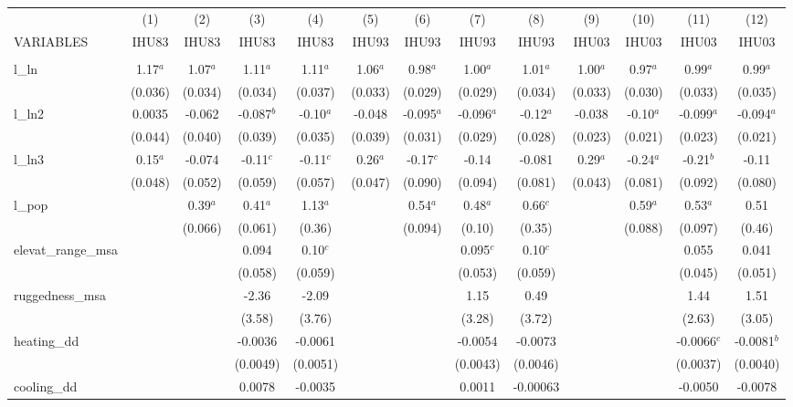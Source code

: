 \documentclass[]{article}
\begin{document}
\begin{tabular}{lcccccccccccc} \hline
 & (1) & (2) & (3) & (4) & (5) & (6) & (7) & (8) & (9) & (10) & (11) & (12) \\
VARIABLES & IHU83 & IHU83 & IHU83 & IHU83 & IHU93 & IHU93 & IHU93 & IHU93 & IHU03 & IHU03 & IHU03 & IHU03 \\ \hline
 &  &  &  &  &  &  &  &  &  &  &  &  \\
l\_ln & 1.17$^a$ & 1.07$^a$ & 1.11$^a$ & 1.11$^a$ & 1.06$^a$ & 0.98$^a$ & 1.00$^a$ & 1.01$^a$ & 1.00$^a$ & 0.97$^a$ & 0.99$^a$ & 0.99$^a$ \\
 & (0.036) & (0.034) & (0.034) & (0.037) & (0.033) & (0.029) & (0.029) & (0.034) & (0.033) & (0.030) & (0.033) & (0.035) \\
l\_ln2 & 0.0035 & -0.062 & -0.087$^b$ & -0.10$^a$ & -0.048 & -0.095$^a$ & -0.096$^a$ & -0.12$^a$ & -0.038 & -0.10$^a$ & -0.099$^a$ & -0.094$^a$ \\
 & (0.044) & (0.040) & (0.039) & (0.035) & (0.039) & (0.031) & (0.029) & (0.028) & (0.023) & (0.021) & (0.023) & (0.021) \\
l\_ln3 & 0.15$^a$ & -0.074 & -0.11$^c$ & -0.11$^c$ & 0.26$^a$ & -0.17$^c$ & -0.14 & -0.081 & 0.29$^a$ & -0.24$^a$ & -0.21$^b$ & -0.11 \\
 & (0.048) & (0.052) & (0.059) & (0.057) & (0.047) & (0.090) & (0.094) & (0.081) & (0.043) & (0.081) & (0.092) & (0.080) \\
l\_pop &  & 0.39$^a$ & 0.41$^a$ & 1.13$^a$ &  & 0.54$^a$ & 0.48$^a$ & 0.66$^c$ &  & 0.59$^a$ & 0.53$^a$ & 0.51 \\
 &  & (0.066) & (0.061) & (0.36) &  & (0.094) & (0.10) & (0.35) &  & (0.088) & (0.097) & (0.46) \\
elevat\_range\_msa &  &  & 0.094 & 0.10$^c$ &  &  & 0.095$^c$ & 0.10$^c$ &  &  & 0.055 & 0.041 \\
 &  &  & (0.058) & (0.059) &  &  & (0.053) & (0.059) &  &  & (0.045) & (0.051) \\
ruggedness\_msa &  &  & -2.36 & -2.09 &  &  & 1.15 & 0.49 &  &  & 1.44 & 1.51 \\
 &  &  & (3.58) & (3.76) &  &  & (3.28) & (3.72) &  &  & (2.63) & (3.05) \\
heating\_dd &  &  & -0.0036 & -0.0061 &  &  & -0.0054 & -0.0073 &  &  & -0.0066$^c$ & -0.0081$^b$ \\
 &  &  & (0.0049) & (0.0051) &  &  & (0.0043) & (0.0046) &  &  & (0.0037) & (0.0040) \\
cooling\_dd &  &  & 0.0078 & -0.0035 &  &  & 0.0011 & -0.00063 &  &  & -0.0050 & -0.0078 \\

\end{tabular}
\end{document}
